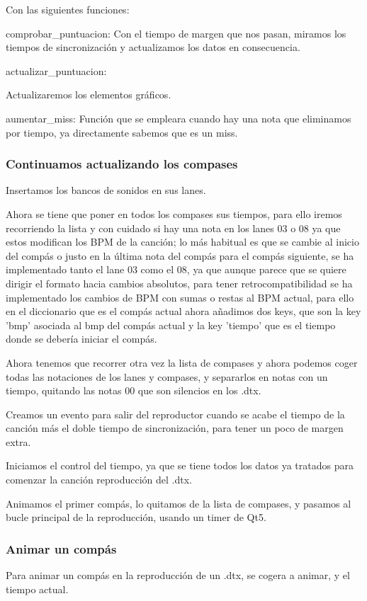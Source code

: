 \documentclass[a4paper,11pt,oneside]{book}
\begin{document}
Con las siguientes funciones:

comprobar\_puntuacion:
Con el tiempo de margen que nos pasan, miramos los tiempos de sincronización y actualizamos los datos en consecuencia.

actualizar\_puntuacion:

Actualizaremos los elementos gráficos.

aumentar\_miss: 
Función que se empleara cuando hay una nota que eliminamos por tiempo, ya directamente sabemos que es un miss.



\subsubsection{Continuamos actualizando los compases}
Insertamos los bancos de sonidos en sus lanes.

Ahora se tiene que poner en todos los compases sus tiempos, para ello iremos recorriendo la lista y con cuidado si hay una nota en los lanes 03 o 08 ya que estos modifican los BPM de la canción; lo más habitual es que se cambie al inicio del compás o justo en la última nota del compás para el compás siguiente, se ha implementado tanto el lane 03 como el 08, ya que aunque parece que se quiere dirigir el formato hacia cambios absolutos, para tener retrocompatibilidad se ha implementado los cambios de BPM con sumas o restas al BPM actual, para ello en el diccionario que es el compás actual ahora añadimos dos keys, que son la key 'bmp' asociada al bmp del compás actual y la key 'tiempo' que es el tiempo donde se debería iniciar el compás.

Ahora tenemos que recorrer otra vez la lista de compases y ahora podemos coger todas las notaciones de los lanes y compases, y separarlos en notas con un tiempo, quitando las notas 00 que son silencios en los .dtx.

Creamos un evento para salir del reproductor cuando se acabe el tiempo de la canción más el doble tiempo de sincronización, para tener un poco de margen extra.

Iniciamos el control del tiempo, ya que se tiene todos los datos ya tratados para comenzar la canción reproducción del .dtx.

Animamos el primer compás, lo quitamos de la lista de compases, y pasamos al bucle principal de la reproducción, usando un timer de Qt5.


\subsubsection{Animar un compás}
Para animar un compás en la reproducción de un .dtx, se cogera a animar, y el tiempo actual.
\end{document}
